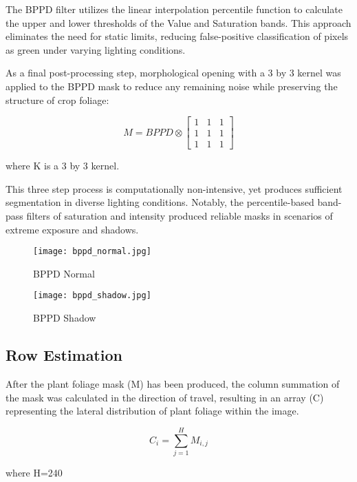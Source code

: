 The BPPD filter utilizes the linear interpolation percentile function
to calculate the upper and lower thresholds of the Value and
Saturation bands. This approach eliminates the need for static limits,
reducing false-positive classification of pixels as green under
varying lighting conditions.

As a final post-processing step, morphological opening with a 3 by 3
kernel was applied to the BPPD mask to reduce any remaining noise
while preserving the structure of crop foliage:

\begin{equation}
M = BPPD \otimes
\begin{bmatrix}
       1 & 1 & 1\\[0.3em]
       1 & 1 & 1 \\[0.3em]
       1 & 1 & 1
     \end{bmatrix}
\label{eq:morph_opening}
\end{equation}
\begin{flushleft}
where K is a 3 by 3 kernel.
\end{flushleft}

This three step process is computationally non-intensive, yet produces
sufficient segmentation in diverse lighting conditions. Notably, the
percentile-based band-pass filters of saturation and intensity
produced reliable masks in scenarios of extreme exposure and shadows.

\begin{figure}
  \centering
  \texttt{[image: bppd\_normal.jpg]}
  \caption{BPPD Normal}
  \label{fig:bppd_normal}
\end{figure}

\begin{figure}
  \centering
  \texttt{[image: bppd\_shadow.jpg]}
  \caption{BPPD Shadow}
  \label{fig:bppd_shadow}
\end{figure}

\subsection{Row Estimation}
After the plant foliage mask (M) has been produced, the column
summation of the mask was calculated in the direction of travel,
resulting in an array (C) representing the lateral distribution of
plant foliage within the image. 

\begin{equation}
  C_{i} = \displaystyle\sum_{j=1}^{H} M_{i,j}
  \label{eq:col_sum}
\end{equation}
\begin{flushleft}
where H=240
\end{flushleft}

